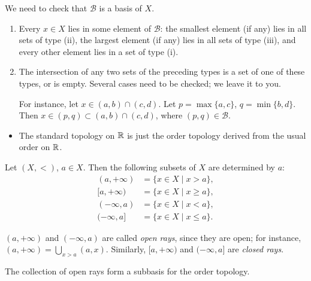 We need to check that $\mathcal{B}$ is a basis of $X$.
\begin{enumerate}[label=(\roman*)]
\item Every $x\in X$ lies in some element of $\mathcal{B}$: the smallest element (if any) lies in all sets of type (ii), the largest element (if any) lies in all sets of type (iii), and every other element lies in a set of type (i).
\item The intersection of any two sets of the preceding types is a set of one of these types, or is empty. Several cases need to be checked; we leave it to you.

For instance, let $x\in(a,b)\cap(c,d)$. Let $p=\max\{a,c\}$, $q=\min\{b,d\}$. Then $x\in(p,q)\subset(a,b)\cap(c,d)$, where $(p,q)\in\mathcal{B}$.
\end{enumerate}

\begin{example}\hfill
\begin{itemize}
\item The standard topology on $\mathbb R$ is just the order topology derived from the usual order on $\mathbb R$.
\end{itemize}
\end{example}

\begin{definition}
Let $(X,<)$, $a\in X$. Then the following subsets of $X$ are  determined by $a$:
\begin{align*}
(a,+\infty)&=\{x\in X\mid x>a\},\\
[a,+\infty)&=\{x\in X\mid x\ge a\},\\
(-\infty,a)&=\{x\in X\mid x<a\},\\
(-\infty,a]&=\{x\in X\mid x\le a\}.
\end{align*}
\end{definition}

$(a,+\infty)$ and $(-\infty,a)$ are called \emph{open rays}, since they are open; for instance, $(a,+\infty)=\bigcup_{x>a}(a,x)$. Similarly, $[a,+\infty)$ and $(-\infty,a]$ are \emph{closed rays}.

\begin{lemma}
The collection of open rays form a subbasis for the order topology.
\end{lemma}

